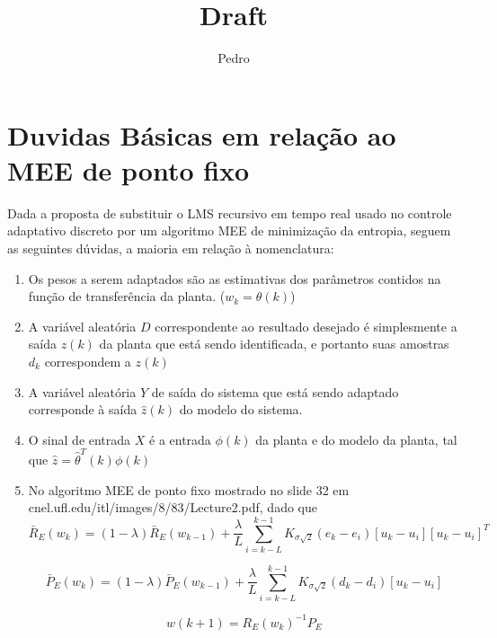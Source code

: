 \documentclass[11pt]{report}
\title{Draft}
\author{Pedro}
\begin{document}
\section{Duvidas Básicas em relação ao MEE de ponto fixo}

Dada a proposta de substituir o LMS recursivo em tempo real usado no controle adaptativo discreto por um algoritmo MEE de minimização da entropia, seguem as seguintes dúvidas, a maioria em relação à nomenclatura:\\
\begin{enumerate}
\item[1] Os pesos a serem adaptados são as estimativas dos parâmetros contidos na função de transferência da planta. ($w_k = \hat{\theta}(k)$)\\
\item[2]A variável aleatória $D$ correspondente ao resultado desejado é simplesmente a saída $z(k)$ da planta que está sendo identificada, e portanto suas amostras $d_k$ correspondem a $z(k)$\\
\item[3] A variável aleatória $Y$ de saída do sistema que está sendo adaptado corresponde à saída $\hat{z}(k)$ do modelo do sistema.\\

\item[4] O sinal de entrada $X$ é a entrada $\phi(k)$ da planta e do modelo da planta, tal que $\hat{z} = \hat{\theta}^T(k)\phi(k)$\\

\item[5] No algoritmo MEE de ponto fixo mostrado no slide 32 em cnel.ufl.edu/itl/images/8/83/Lecture2.pdf, dado que\\
\begin{equation*}
\bar{R}_E(w_k) = (1-\lambda)\bar{R}_E(w_{k-1}) + \frac{\lambda}{L} \sum_{i=k-L}^{k-1} K_{\sigma \sqrt{2} }(e_k - e_i) [u_k - u_i][u_k - u_i]^T
\end{equation*}

\begin{equation*}
\bar{P}_E(w_k) = (1-\lambda)\bar{P}_E(w_{k-1}) + \frac{\lambda}{L} \sum_{i=k-L}^{k-1} K_{\sigma \sqrt{2} }(d_k - d_i) [u_k - u_i]
\end{equation*}

\begin{equation*}
w(k+1) = R_E(w_k)^{-1}P_E
\end{equation*}


\end{enumerate}
\end{document}
